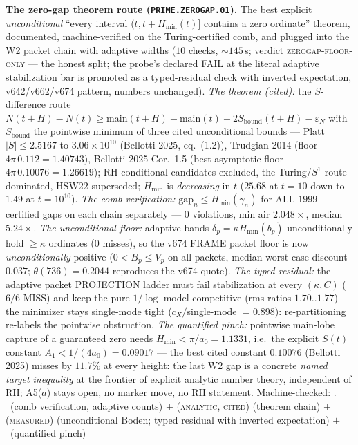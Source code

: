 \par\smallskip\noindent\textbf{The zero-gap theorem route
(\texttt{PRIME.ZEROGAP.01}).}
The best explicit \emph{unconditional} ``every interval
$(t, t+H_{\min}(t)]$ contains a zero ordinate'' theorem, documented,
machine-verified on the Turing-certified comb, and plugged into the
W2 packet chain with adaptive widths ($10$ checks, ${\sim}145$\,s;
verdict \textsc{zerogap-floor-only} --- the honest split; the probe's
declared FAIL at the literal adaptive stabilization bar is promoted
as a typed-residual check with inverted expectation, v642/v662/v674
pattern, numbers unchanged).  \emph{The theorem (cited):} the
$S$-difference route $N(t+H)-N(t)\ge\mathrm{main}(t+H)-
\mathrm{main}(t)-2S_{\mathrm{bound}}(t+H)-\varepsilon_N$ with
$S_{\mathrm{bound}}$ the pointwise minimum of three cited
unconditional bounds --- Platt $|S|\le2.5167$ to $3.06\times10^{10}$
(Bellotti 2025, eq.~(1.2)), Trudgian 2014 (floor
$4\pi\,0.112=1.40743$), Bellotti 2025 Cor.~1.5 (best asymptotic floor
$4\pi\,0.10076=1.26619$); RH-conditional candidates excluded, the
Turing/$S^1$ route dominated, HSW22 superseded; $H_{\min}$ is
\emph{decreasing} in $t$ ($25.68$ at $t=10$ down to $1.49$ at
$t=10^{10}$).  \emph{The comb verification:} $\mathrm{gap}_n\le
H_{\min}(\gamma_n)$ for ALL $1999$ certified gaps on each chain
separately --- $0$ violations, min air $2.048\times$, median
$5.24\times$.  \emph{The unconditional floor:} adaptive bands
$\delta_p=\kappa H_{\min}(b_p)$ unconditionally hold $\ge\kappa$
ordinates ($0$ misses), so the v674 FRAME packet floor is now
\emph{unconditionally} positive ($0<B_p\le V_p$ on all packets,
median worst-case discount $0.037$; $\theta(736)=0.2044$ reproduces
the v674 quote).  \emph{The typed residual:} the adaptive packet
PROJECTION ladder must fail stabilization at every $(\kappa,C)$
($6/6$ MISS) and keep the pure-$1/\log$ model competitive (rms ratios
$1.70..1.77$) --- the minimizer stays single-mode tight
($c_X/$single-mode $=0.898$): re-partitioning re-labels the pointwise
obstruction.  \emph{The quantified pinch:} pointwise main-lobe
capture of a guaranteed zero needs $H_{\min}<\pi/a_0=1.1331$, i.e.\
the explicit $S(t)$ constant $A_1<1/(4a_0)=0.09017$ --- the best
cited constant $0.10076$ (Bellotti 2025) misses by $11.7\%$ at every
height: the last W2 gap is a concrete \emph{named target inequality}
at the frontier of explicit analytic number theory, independent of
RH; A5($a$) stays open, no marker move, no RH statement.
Machine-checked: .
\mE\ (comb verification, adaptive counts) $+$ (\textsc{analytic,
cited}) (theorem chain) $+$ (\textsc{measured}) (unconditional
Boden; typed residual with inverted expectation) $+$ \mC\ (quantified
pinch)
\par\smallskip


